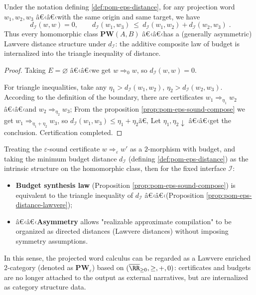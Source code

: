 \begin{proposition}\label{prop:pom-eps-distance-lawvere}
Under the notation defining \ref{def:pom-eps-distance}, for any projection word \(w_1,w_2,w_3\) â€‹â€‹with the same origin and same target, we have
\[
\boxed{\;
d_{\mathcal I}(w,w)=0,\qquad
d_{\mathcal I}(w_1,w_3)\ \le\ d_{\mathcal I}(w_1,w_2)+d_{\mathcal I}(w_2,w_3)\; }.
\]
Thus every homomorphic class \(\mathbf{PW}(A,B)\) â€‹â€‹has a (generally asymmetric) Lawvere distance structure under \(d_{\mathcal I}\): the additive composite law of budget is internalized into the triangle inequality of distance.
\end{proposition}
\begin{proof}
Taking \(E=\varnothing\) â€‹â€‹we get \(w\Longrightarrow_0 w\), so \(d_{\mathcal I}(w,w)=0\).
\par
For triangle inequalities, take any \(\eta_1>d_{\mathcal I}(w_1,w_2)\), \(\eta_2>d_{\mathcal I}(w_2,w_3)\).
According to the definition of the boundary, there are certificates \(w_1\Longrightarrow_{\eta_1} w_2\) â€‹â€‹and \(w_2\Longrightarrow_{\eta_2} w_3\);
From the proposition \ref{prop:pom-eps-sound-compose} we get \(w_1\Longrightarrow_{\eta_1+\eta_2} w_3\), so
\(
d_{\mathcal I}(w_1,w_3)\le \eta_1+\eta_2
\)ã€‚
Let \(\eta_1,\eta_2\downarrow\) â€‹â€‹get the conclusion. Certification completed.
\end{proof}

\begin{remark}\label{rem:pom-pw-eps-lawvere}
Treating the \(\varepsilon\)-sound certificate \(w\Longrightarrow_\varepsilon w'\) as a \(2\)-morphism with budget, and taking the minimum budget distance \(d_{\mathcal I}\) (defining \ref{def:pom-eps-distance}) as the intrinsic structure on the homomorphic class, then for the fixed interface \(\mathcal I\):
\begin{itemize}
  \item \textbf{Budget synthesis law} (Proposition \ref{prop:pom-eps-sound-compose}) is equivalent to the triangle inequality of \(d_{\mathcal I}\) â€‹â€‹(Proposition \ref{prop:pom-eps-distance-lawvere});
  \item â€‹â€‹\textbf{Asymmetry} allows "realizable approximate compilation" to be organized as directed distances (Lawvere distances) without imposing symmetry assumptions.
\end{itemize}
In this sense, the projected word calculus can be regarded as a Lawvere enriched \(2\)-category (denoted as \(\mathbf{PW}_\varepsilon\)) based on \((\overline{\RR}_{\ge 0},\ge,+,0)\): certificates and budgets are no longer attached to the output as external narratives, but are internalized as category structure data.
\end{remark}

